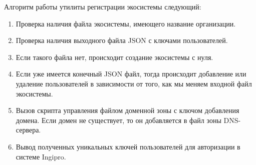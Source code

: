 Алгоритм работы утилиты регистрации экосистемы следующий:
\begin{enumerate}
	\item Проверка наличия файла экосистемы, имеющего название организации.
	\item Проверка наличия выходного файла JSON с ключами пользователей.
	\item Если такого файла нет, происходит создание экосистемы с нуля.
	\item Если уже имеется конечный JSON файл, тогда происходит добавление или удаление пользователей в зависимости от того, как мы меняем входной файл экосистемы.
	\item Вызов скрипта управления файлом доменной зоны с ключом добавления домена. Если домен не существует, то он добавляется в файл зоны DNS-сервера.
	\item Вывод полученных уникальных ключей пользователей для авторизации в системе Ingipro.
\end{enumerate}
